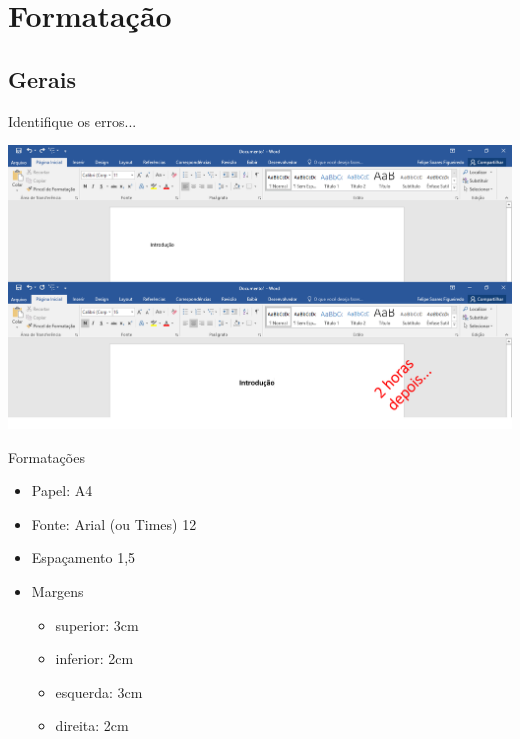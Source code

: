 \documentclass{beamer}
\begin{document}
\section{Formatação}

\subsection{Gerais}

\begin{frame}{Identifique os erros...}
  \begin{center}
    \includegraphics[width=1.2\textwidth]{ProjetoII/intro}
  \end{center}
\end{frame}

\begin{frame}{Formatações}
  \begin{itemize}
  \item Papel: A4
  \item Fonte: Arial (ou Times) 12
  \item Espaçamento 1,5
  \item Margens
    \begin{itemize}
    \item superior: 3cm
    \item inferior: 2cm
    \item esquerda: 3cm
    \item direita: 2cm
    \end{itemize}
  \end{itemize}
\end{frame}
\end{document}
